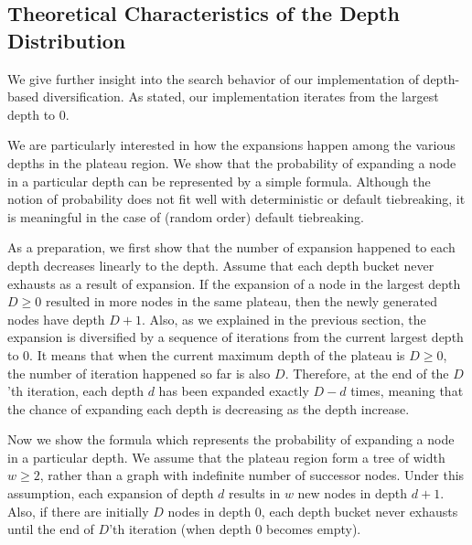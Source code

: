 \subsection{Theoretical Characteristics of the Depth Distribution}

We give further insight into the search behavior of our implementation
of depth-based diversification.
As stated, our implementation iterates from the largest depth to 0.

We are particularly interested in how the expansions happen among the
various depths in the plateau region.
We show that the probability of expanding a node in a particular depth
can be represented by a simple formula.  Although the notion of
probability does not fit well with deterministic \fifo or \lifo
default tiebreaking, it is meaningful in the case of \ro (random
order) default tiebreaking.


As a preparation, we first show that the number of expansion happened to each depth decreases
linearly to the depth.
% 
Assume that each depth bucket never exhausts as a result of
expansion.  If the expansion of a node in the largest depth $D\geq 0$ resulted
in more nodes in the same plateau, then the newly generated nodes have
depth $D+1$.  Also, as we explained in the previous section, the
expansion is diversified by a sequence of iterations from the current
largest depth to 0.  It means that when the current maximum depth of
the plateau is $D\geq 0$, the number of iteration happened so far is also $D$.
Therefore, at the end of the $D$'th iteration, each depth $d$ has
been expanded exactly $D-d$ times, meaning that the chance of
expanding each depth is decreasing as the depth increase.

Now we show the formula which represents the probability of expanding a node in a particular depth.
We assume that the plateau region form a tree of width
$w\geq 2$, rather than a graph with indefinite number of successor
nodes.  Under this assumption, each expansion of depth $d$ results in
$w$ new nodes in depth $d+1$. Also, if there are initially
$D$ nodes in depth 0, each depth bucket never exhausts until the end of $D$'th
iteration (when depth 0 becomes empty).

